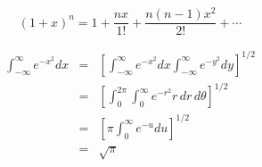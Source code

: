 \begin{displaymath}
 (1+x)^n=1+\frac{nx}{1!}+\frac{n(n-1)x^2}{2!}+\cdots
\end{displaymath}

\setlength\arraycolsep{0.15em}
\begin{eqnarray*}
 \int_{-\infty}^\infty e^{-x^2}dx &=& \left[\int_{-\infty}^\infty e^{-x^2}dx
  \int_{-\infty}^\infty e^{-y^2}dy\right]^{1/2}\\
 &=& \left[\int_{0}^{2\pi} \int_0^\infty e^{-r^2}r\,dr\,d\theta\right]^{1/2}\\
 &=& \left[\pi\int_{0}^\infty e^{-u}du\right]^{1/2}\\
 &=& \sqrt{\pi}
\end{eqnarray*}

\endinput
